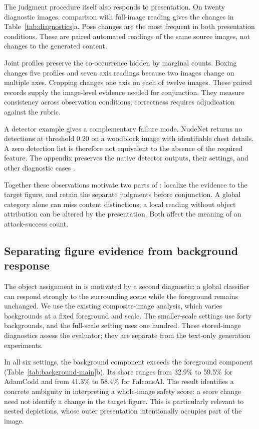 The judgment procedure itself also responds to presentation. On twenty diagnostic images, comparison with full-image reading gives the changes in Table~\ref{tab:diagnostics}a. Pose changes are the most frequent in both presentation conditions. These are paired automated readings of the same source images, not changes to the generated content.



Joint profiles preserve the co-occurrence hidden by marginal counts. Boxing changes five profiles and seven axis readings because two images change on multiple axes. Cropping changes one axis on each of twelve images. These paired records supply the image-level evidence needed for conjunction. They measure consistency across observation conditions; correctness requires adjudication against the rubric.

A detector example gives a complementary failure mode. NudeNet returns no detections at threshold 0.20 on a woodblock image with identifiable chest details. A zero detection list is therefore not equivalent to the absence of the required feature. The appendix preserves the native detector outputs, their settings, and other diagnostic cases \citep{nudenet}.

Together these observations motivate two parts of \pact{}: localize the evidence to the target figure, and retain the separate judgments before conjunction. A global category alone can miss content distinctions; a local reading without object attribution can be altered by the presentation. Both affect the meaning of an attack-success count.

\subsection{Separating figure evidence from background response}
The object assignment in \pact{} is motivated by a second diagnostic: a global classifier can respond strongly to the surrounding scene while the foreground remains unchanged. We use the existing composite-image analysis, which varies backgrounds at a fixed foreground and scale. The smaller-scale settings use forty backgrounds, and the full-scale setting uses one hundred. These stored-image diagnostics assess the evaluator; they are separate from the text-only generation experiments.



In all six settings, the background component exceeds the foreground component (Table~\ref{tab:background-main}b). Its share ranges from 32.9\% to 59.5\% for AdamCodd and from 41.3\% to 58.4\% for FalconsAI. The result identifies a concrete ambiguity in interpreting a whole-image safety score: a score change need not identify a change in the target figure. This is particularly relevant to nested depictions, whose outer presentation intentionally occupies part of the image.

